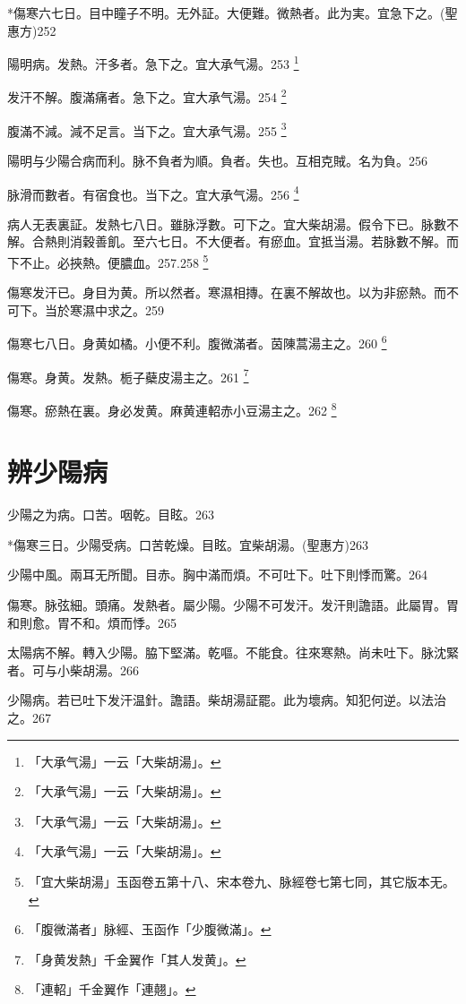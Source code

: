 \documentclass[b5paper,twoside,zihao=-4,UTF8]{ctexbook}
\begin{document}
*傷寒六七日。目中瞳子不明。无外証。大便難。微熱者。此为実。宜急下之。(聖惠方)252

陽明病。发熱。汗多者。急下之。宜{大}承气湯。253
	\footnote{「大承气湯」一云「大柴胡湯」。}

发汗不解。腹滿痛者。急下之。宜{大}承气湯。254
	\footnote{「大承气湯」一云「大柴胡湯」。}

腹滿不減。減不足言。当下之。宜{大}承气湯。255
	\footnote{「大承气湯」一云「大柴胡湯」。}

陽明与少陽合病而利。脉不負者为順。負者。失也。互相克賊。名为負。256

脉滑而數者。有宿食也。当下之。宜{大}承气湯。256
	\footnote{「大承气湯」一云「大柴胡湯」。}

病人无表裏証。发熱七八日。雖脉浮數。可下之。{宜大柴胡湯。}假令下已。脉數不解。合熱則消穀善飢。至六七日。不大便者。有瘀血。宜抵当湯。若脉數不解。而下不止。必挾熱。便膿血。257.258
	\footnote{「宜大柴胡湯」玉函卷五第十八、宋本卷九、脉經卷七第七同，其它版本无。}

傷寒发汗已。身目为黄。所以然者。寒濕相摶。在裏不解故也。以为非瘀熱。而不可下。当於寒濕中求之。259

傷寒七八日。身黄如橘。小便不利。腹微滿者。茵陳{蒿}湯主之。260
	\footnote{「腹微滿者」脉經、玉函作「少腹微滿」。}

傷寒。身黄。发熱。栀子蘗皮湯主之。261
	\footnote{「身黄发熱」千金翼作「其人发黄」。}

傷寒。瘀熱在裏。身必发黄。麻黄連軺赤小豆湯主之。262
	\footnote{「連軺」千金翼作「連翹」。}

\chapter{辨少陽病}

少陽之为病。口苦。咽乾。目眩。263

*傷寒三日。少陽受病。口苦乾燥。目眩。宜柴胡湯。(聖惠方)263

少陽中風。兩耳无所聞。目赤。胸中滿而煩。不可吐下。吐下則悸而驚。264

傷寒。脉弦細。頭痛。发熱者。屬少陽。少陽不可发汗。发汗則譫語。此屬胃。胃和則愈。胃不和。煩而悸。265

太陽病不解。轉入少陽。脇下堅滿。乾嘔。不能食。往來寒熱。尚未吐下。脉沈緊者。可与小柴胡湯。266

{少陽病。}若已吐下发汗温針。{譫語。}柴胡湯証罷。此为壞病。知犯何逆。以法治之。267
\end{document}
